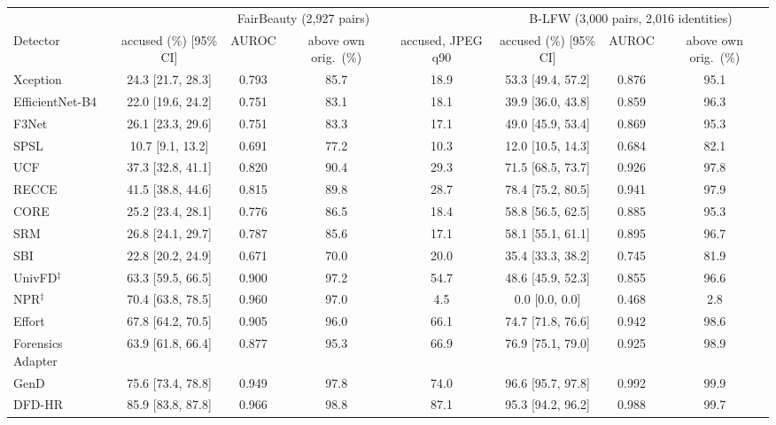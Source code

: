 \begin{tabular}{@{}l cccc ccc@{}}
\toprule
 & \multicolumn{4}{c}{FairBeauty (2,927 pairs)} & \multicolumn{3}{c}{B-LFW (3,000 pairs, 2,016 identities)} \\
\cmidrule(lr){2-5}\cmidrule(lr){6-8}
Detector & accused (\%) [95\% CI] & AUROC & above own orig.\ (\%) & accused, JPEG q90 & accused (\%) [95\% CI] & AUROC & above own orig.\ (\%) \\
\midrule
Xception~\cite{xception} & 24.3 [21.7, 28.3] & 0.793 & 85.7 & 18.9 & 53.3 [49.4, 57.2] & 0.876 & 95.1 \\
EfficientNet-B4~\cite{efficientnet} & 22.0 [19.6, 24.2] & 0.751 & 83.1 & 18.1 & 39.9 [36.0, 43.8] & 0.859 & 96.3 \\
F3Net~\cite{f3net} & 26.1 [23.3, 29.6] & 0.751 & 83.3 & 17.1 & 49.0 [45.9, 53.4] & 0.869 & 95.3 \\
SPSL~\cite{spsl} & 10.7 [9.1, 13.2] & 0.691 & 77.2 & 10.3 & 12.0 [10.5, 14.3] & 0.684 & 82.1 \\
UCF~\cite{ucf} & 37.3 [32.8, 41.1] & 0.820 & 90.4 & 29.3 & 71.5 [68.5, 73.7] & 0.926 & 97.8 \\
RECCE~\cite{recce} & 41.5 [38.8, 44.6] & 0.815 & 89.8 & 28.7 & 78.4 [75.2, 80.5] & 0.941 & 97.9 \\
CORE~\cite{core} & 25.2 [23.4, 28.1] & 0.776 & 86.5 & 18.4 & 58.8 [56.5, 62.5] & 0.885 & 95.3 \\
SRM~\cite{srm} & 26.8 [24.1, 29.7] & 0.787 & 85.6 & 17.1 & 58.1 [55.1, 61.1] & 0.895 & 96.7 \\
SBI~\cite{sbi} & 22.8 [20.2, 24.9] & 0.671 & 70.0 & 20.0 & 35.4 [33.3, 38.2] & 0.745 & 81.9 \\
UnivFD$^\ddagger$~\cite{univfd} & 63.3 [59.5, 66.5] & 0.900 & 97.2 & 54.7 & 48.6 [45.9, 52.3] & 0.855 & 96.6 \\
NPR$^\ddagger$~\cite{npr} & 70.4 [63.8, 78.5] & 0.960 & 97.0 & 4.5 & 0.0 [0.0, 0.0] & 0.468 & 2.8 \\
Effort~\cite{effort} & 67.8 [64.2, 70.5] & 0.905 & 96.0 & 66.1 & 74.7 [71.8, 76.6] & 0.942 & 98.6 \\
Forensics Adapter~\cite{forensicsadapter} & 63.9 [61.8, 66.4] & 0.877 & 95.3 & 66.9 & 76.9 [75.1, 79.0] & 0.925 & 98.9 \\
GenD~\cite{gend2026} & 75.6 [73.4, 78.8] & 0.949 & 97.8 & 74.0 & 96.6 [95.7, 97.8] & 0.992 & 99.9 \\
DFD-HR~\cite{dfdhr2026} & 85.9 [83.8, 87.8] & 0.966 & 98.8 & 87.1 & 95.3 [94.2, 96.2] & 0.988 & 99.7 \\

\end{tabular}
